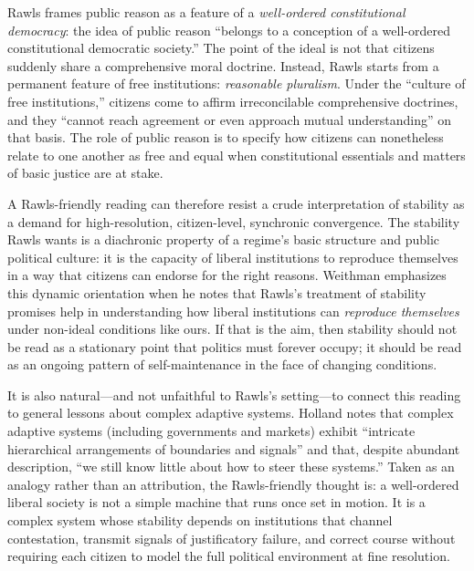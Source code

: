 \documentclass[12pt]{report}
\begin{document}
Rawls frames public reason as a feature of a \emph{well-ordered constitutional democracy}: the idea of public reason ``belongs to a conception of a well-ordered constitutional democratic society.'' \parencite[p.~765]{rawls1997public} The point of the ideal is not that citizens suddenly share a comprehensive moral doctrine. Instead, Rawls starts from a permanent feature of free institutions: \emph{reasonable pluralism}. Under the ``culture of free institutions,'' citizens come to affirm irreconcilable comprehensive doctrines, and they ``cannot reach agreement or even approach mutual understanding'' on that basis. \parencite[p.~766]{rawls1997public} The role of public reason is to specify how citizens can nonetheless relate to one another as free and equal when constitutional essentials and matters of basic justice are at stake. \parencite[pp.~767, 772]{rawls1997public}

A Rawls-friendly reading can therefore resist a crude interpretation of stability as a demand for high-resolution, citizen-level, synchronic convergence. The stability Rawls wants is a diachronic property of a regime’s basic structure and public political culture: it is the capacity of liberal institutions to reproduce themselves in a way that citizens can endorse for the right reasons. Weithman emphasizes this dynamic orientation when he notes that Rawls’s treatment of stability promises help in understanding how liberal institutions can \emph{reproduce themselves} under non-ideal conditions like ours. \parencite[p.~1187]{Weithman2024Rescuing} If that is the aim, then stability should not be read as a stationary point that politics must forever occupy; it should be read as an ongoing pattern of self-maintenance in the face of changing conditions.

It is also natural---and not unfaithful to Rawls’s setting---to connect this reading to general lessons about complex adaptive systems. Holland notes that complex adaptive systems (including governments and markets) exhibit ``intricate hierarchical arrangements of boundaries and signals'' and that, despite abundant description, ``we still know little about how to steer these systems.'' \parencite[p.~1]{holland2012signals} Taken as an analogy rather than an attribution, the Rawls-friendly thought is: a well-ordered liberal society is not a simple machine that runs once set in motion. It is a complex system whose stability depends on institutions that channel contestation, transmit signals of justificatory failure, and correct course without requiring each citizen to model the full political environment at fine resolution.
\end{document}
